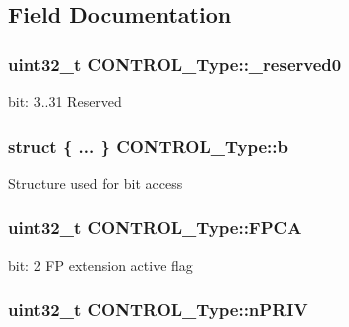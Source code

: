 \subsection{Field Documentation}
\hypertarget{unionCONTROL__Type_af8c314273a1e4970a5671bd7f8184f50}{
\subsubsection[{\-\_\-reserved0}]{\setlength{\rightskip}{0pt plus 5cm}uint32\-\_\-t C\-O\-N\-T\-R\-O\-L\-\_\-\-Type\-::\-\_\-reserved0}}\label{unionCONTROL__Type_af8c314273a1e4970a5671bd7f8184f50}
bit\-: 3..31 Reserved \hypertarget{unionCONTROL__Type_aa4d954e3b3024e7d3f2e7fb52b1cfa77}{
\subsubsection[{b}]{\setlength{\rightskip}{0pt plus 5cm}struct \{ ... \}   C\-O\-N\-T\-R\-O\-L\-\_\-\-Type\-::b}}\label{unionCONTROL__Type_aa4d954e3b3024e7d3f2e7fb52b1cfa77}
Structure used for bit access \hypertarget{unionCONTROL__Type_ac62cfff08e6f055e0101785bad7094cd}{
\subsubsection[{F\-P\-C\-A}]{\setlength{\rightskip}{0pt plus 5cm}uint32\-\_\-t C\-O\-N\-T\-R\-O\-L\-\_\-\-Type\-::\-F\-P\-C\-A}}\label{unionCONTROL__Type_ac62cfff08e6f055e0101785bad7094cd}
bit\-: 2 F\-P extension active flag \hypertarget{unionCONTROL__Type_a35c1732cf153b7b5c4bd321cf1de9605}{
\subsubsection[{n\-P\-R\-I\-V}]{\setlength{\rightskip}{0pt plus 5cm}uint32\-\_\-t C\-O\-N\-T\-R\-O\-L\-\_\-\-Type\-::n\-P\-R\-I\-V}}\label{unionCONTROL__Type_a35c1732cf153b7b5c4bd321cf1de9605}

